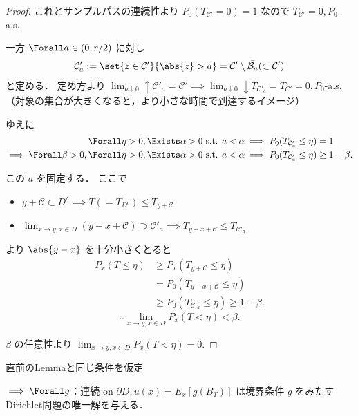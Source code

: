 \documentclass{jsarticle}
\begin{document}
\begin{proof}
    これとサンプルパスの連続性より $P_0(T_{\mathcal{C}'}=0) = 1$ なので $T_{\mathcal{C}'}=0, P_0$-a.s.\nazo

    一方 $\Forall a\in(0, r/2)$ に対し
    \begin{align}
        \mathcal{C}'_a
        := \set{z\in\mathcal{C}'}{\abs{z}>a}
        = \mathcal{C}'\setminus \bar{\mathcal{B}_{a}}
        (\subset \mathcal{C}')
    \end{align}
    と定める．
    定め方より $\lim_{a\downarrow0}\uparrow\mathcal{C}'_a=\mathcal{C}'\implies \lim_{a\downarrow0}\downarrow T_{\mathcal{C}'_a}=T_{\mathcal{C}'}=0, P_0$-a.s.（対象の集合が大きくなると，より小さな時間で到達するイメージ）

    ゆえに 
    \begin{align}
        \Forall \eta>0, \Exists \alpha>0\text{ s.t. }
        & a<\alpha\implies P_0(T_{\mathcal{C}'_a}\le\eta)=1 \\
        \implies 
        \Forall \beta>0, \Forall \eta>0, \Exists \alpha>0\text{ s.t. }
        & a<\alpha\implies P_0(T_{\mathcal{C}'_a}\le\eta)\ge1-\beta.
    \end{align}

    この $a$ を固定する．
    ここで
    \begin{itemize}
        \item 
        $y+\mathcal{C}\subset D^c\implies T(=T_{D^c})\le T_{y+\mathcal{C}}$
        \item
        $\lim_{x\to y, x\in D}(y-x+\mathcal{C})\supset \mathcal{C}'_a\implies T_{y-x+\mathcal{C}}\le T_{\mathcal{C}'_a}$
    \end{itemize}
     より $\abs{y-x}$ を十分小さくとると
     \begin{align}
         P_x(T\le\eta)
         &\ge P_x(T_{y+\mathcal{C}}\le\eta) \\
         &= P_0(T_{y-x+\mathcal{C}}\le\eta) \\
         &\ge P_0(T_{\mathcal{C}'_a}\le\eta)
         \ge 1-\beta.
     \end{align}
     $$
     \therefore 
     \lim_{x\to y, x\in D}P_x(T<\eta)<\beta.
     $$

     $\beta$ の任意性より $\lim_{x\to y, x\in D}P_x(T<\eta)=0.$
\end{proof}


\setcounter{thm}{7}
\begin{thm}[Dirichlet問題の解]
    直前のLemmaと同じ条件を仮定
    
    $\implies \Forall g$：連続 on $\partial D, u(x) = E_x[g(B_T)]$ は境界条件 $g$ をみたすDirichlet問題の唯一解を与える．
\end{thm}
\end{document}

